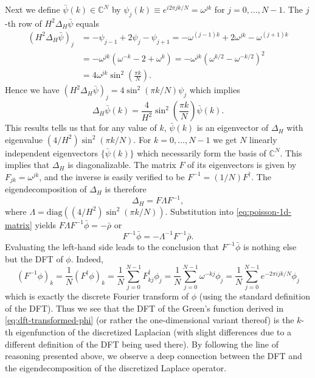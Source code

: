 Next we define $\bar{\psi}(k) \in \mathbb{C}^N$ by $\psi_j(k) \equiv e^{i2\pi jk/N} = \omega^{jk}$ for $j=0,\dots,N-1$.
The $j$-th row of $H^2\Delta_H \bar{\psi}$ equals
\begin{align*}
    (H^2\Delta_H \bar{\psi})_j
     & = -\psi_{j-1} + 2\psi_j - \psi_{j+1}
    = -\omega^{(j-1)k} + 2\omega^{jk} - \omega^{(j+1)k}     \\
     & = -\omega^{jk}(\omega^{-k} - 2 + \omega^k)
    = -\omega^{jk}(\omega^{k/2} - \omega^{-k/2})^2          \\
     & = 4\omega^{jk} \sin^2\left( \frac{\pi k}{N} \right).
\end{align*}
Hence we have $(H^2\Delta_H \bar{\psi})_j = 4\sin^2(\pi k/N) \psi_j$ which implies
\begin{equation*}
    \Delta_H \bar{\psi}(k)
    = \frac{4}{H^2} \sin^2\left( \frac{\pi k}{N} \right) \bar{\psi}(k).
\end{equation*}
This results tells us that for any value of $k$, $\bar{\psi}(k)$ is an eigenvector of $\Delta_H$ with eigenvalue $(4/H^2)\sin^2(\pi k/N)$.
For $k=0,\dots, N-1$ we get $N$ linearly independent eigenvectors $\{\bar{\psi}(k)\}$ which necessarily form the basis of $\mathbb{C}^N$.
This implies that $\Delta_H$ is diagonalizable.
The matrix $F$ of its eigenvectors is given by $F_{jk} = \omega^{jk}$, and the inverse is easily verified to be $F^{-1} = (1/N)F^\dagger$.
The eigendecomposition of $\Delta_H$ is therefore
\begin{equation*}
    \Delta_H = F\Lambda F^{-1},
\end{equation*}
where $\Lambda = \text{diag}((4/H^2)\sin^2(\pi k/N))$.
Substitution into \autoref{eq:poisson-1d-matrix} yields $F\Lambda F^{-1} \bar{\phi} = -\bar{\rho}$ or
\begin{equation*}
    F^{-1}\bar{\phi} = -\Lambda^{-1}F^{-1}\bar{\rho}.
\end{equation*}
Evaluating the left-hand side leads to the conclusion that $F^{-1}\bar\phi$ is nothing else but the DFT of $\phi$.
Indeed,
\begin{equation*}
    (F^{-1}\phi)_k
    = \frac{1}{N}(F^\dagger \phi)_k
    = \frac{1}{N}\sum_{j=0}^{N-1}F^\dagger_{kj}\phi_j
    = \frac{1}{N}\sum_{j=0}^{N-1}\omega^{-kj}\phi_j
    = \frac{1}{N}\sum_{j=0}^{N-1}e^{-2\pi i jk / N}\phi_j
\end{equation*}
which is exactly the discrete Fourier transform of $\phi$ (using the standard definition of the DFT).
Thus we see that the DFT of the Green's function derived in \autoref{eq:dft-transformed-phi} (or rather the one-dimensional variant thereof) is the $k$-th eigenfunction of the discretized Laplacian (with slight differences due to a different definition of the DFT being used there).
By following the line of reasoning presented above, we observe a deep connection between the DFT and the eigendecomposition of the discretized Laplace operator.

